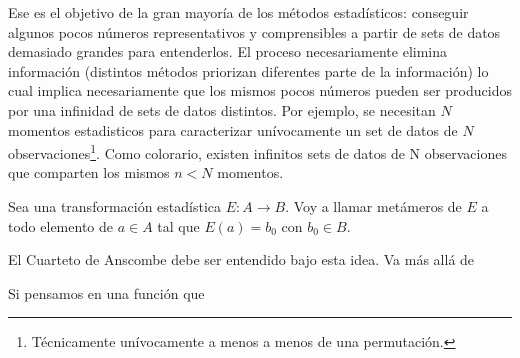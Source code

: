 \documentclass[runningheads,13pt]{llncs}\usepackage{knitr}
\begin{document}
Ese es el objetivo de la gran mayoría de los métodos estadísticos: conseguir algunos pocos números representativos y comprensibles a partir de sets de datos demasiado grandes para entenderlos. El proceso necesariamente elimina información (distintos métodos priorizan diferentes parte de la información) lo cual implica necesariamente que los mismos pocos números pueden ser producidos por una infinidad de sets de datos distintos. Por ejemplo, se necesitan $N$ momentos estadisticos para caracterizar unívocamente un set de datos de $N$ observaciones\footnote{Técnicamente unívocamente a menos a menos de una permutación.}. Como colorario, existen infinitos sets de datos de N observaciones que comparten los mismos $n < N$ momentos. 

Sea una transformación estadística $E : A \rightarrow B$. Voy a llamar metámeros de $E$ a todo elemento de $a \in A$ tal que $E(a) = b_0$ con $b_0 \in B$.


El Cuarteto de Anscombe debe ser entendido bajo esta idea. Va más allá de 




Si pensamos en una función que 
\end{document}
